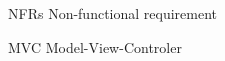 \begin{siglas}
  \item[NFRs] Non-functional requirement
  \item[MVC] Model-View-Controler
\end{siglas}
